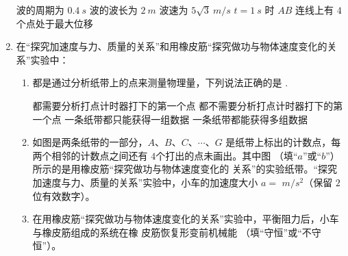 \begin{enumerate}
\fourchoices
{波的周期为 $ 0.4 \ s $}
{波的波长为 $ 2 \ m $}
{波速为 $ 5\sqrt{3} \ m/s $}
{$ t=1 \ s $ 时 $ AB $ 连线上有 $ 4 $ 个点处于最大位移}




\gaokaosy


\item
在“探究加速度与力、质量的关系”和用橡皮筋“探究做功与物体速度变化的关系”实验中：
\begin{enumerate}
\item
都是通过分析纸带上的点来测量物理量，下列说法正确的是 \underlinegap .

\fourchoices
{都需要分析打点计时器打下的第一个点}
{都不需要分析打点计时器打下的第一个点}
{一条纸带都只能获得一组数据}
{一条纸带都能获得多组数据}


\item 
如图是两条纸带的一部分，$ A $、$ B $、$ C $、$ \cdots $、$ G $ 是纸带上标出的计数点，每两个相邻的计数点之间还有
$ 4 $个打出的点未画出。其中图 \underlinegap （填“$ a $”或“$ b $”）所示的是用橡皮筋“探究做功与物体速度变化的
关系”的实验纸带。“探究加速度与力、质量的关系”实验中，小车的加速度大小 $ a=$ \underlinegap $m/s^{2} $（保留 $ 2 $ 位有效数字）。
\begin{figure}[h!]
\centering
\begin{subfigure}{0.7\linewidth}
\centering
%
  
\caption{}\label{}
\end{subfigure}
\begin{subfigure}{0.7\linewidth}
\centering
%
  
\caption{}\label{}
\end{subfigure}

\end{figure}



\item 
在用橡皮筋“探究做功与物体速度变化的关系”实验中，平衡阻力后，小车与橡皮筋组成的系统在橡
皮筋恢复形变前机械能 \underlinegap （填“守恒”或“不守恒”）。



\end{enumerate}
\end{enumerate}
